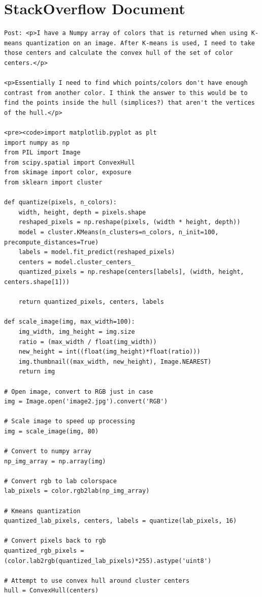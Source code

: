 \documentclass[a4paper,oneside]{book}
\begin{document}
\newpage
\appendix
\chapter{StackOverflow Document}
\label{app:stackoverflow_doc}
\begin{lstlisting}
Post: <p>I have a Numpy array of colors that is returned when using K-means quantization on an image. After K-means is used, I need to take those centers and calculate the convex hull of the set of color centers.</p>

<p>Essentially I need to find which points/colors don't have enough contrast from another color. I think the answer to this would be to find the points inside the hull (simplices?) that aren't the vertices of the hull.</p>

<pre><code>import matplotlib.pyplot as plt
import numpy as np
from PIL import Image
from scipy.spatial import ConvexHull
from skimage import color, exposure
from sklearn import cluster

def quantize(pixels, n_colors):
    width, height, depth = pixels.shape
    reshaped_pixels = np.reshape(pixels, (width * height, depth))
    model = cluster.KMeans(n_clusters=n_colors, n_init=100, precompute_distances=True)
    labels = model.fit_predict(reshaped_pixels)
    centers = model.cluster_centers_
    quantized_pixels = np.reshape(centers[labels], (width, height, centers.shape[1]))

    return quantized_pixels, centers, labels

def scale_image(img, max_width=100):
    img_width, img_height = img.size
    ratio = (max_width / float(img_width))
    new_height = int((float(img_height)*float(ratio)))
    img.thumbnail((max_width, new_height), Image.NEAREST)
    return img

# Open image, convert to RGB just in case
img = Image.open('image2.jpg').convert('RGB')

# Scale image to speed up processing
img = scale_image(img, 80)

# Convert to numpy array
np_img_array = np.array(img)

# Convert rgb to lab colorspace
lab_pixels = color.rgb2lab(np_img_array)

# Kmeans quantization
quantized_lab_pixels, centers, labels = quantize(lab_pixels, 16)

# Convert pixels back to rgb
quantized_rgb_pixels = (color.lab2rgb(quantized_lab_pixels)*255).astype('uint8')

# Attempt to use convex hull around cluster centers
hull = ConvexHull(centers)


\end{lstlisting}
\end{document}
